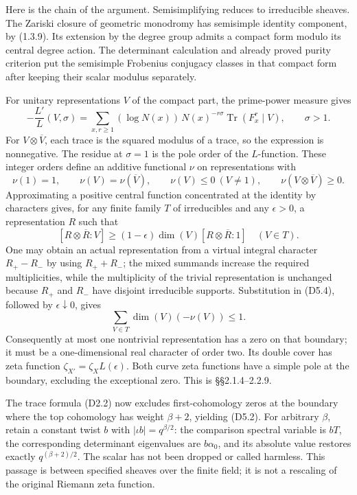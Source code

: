 Here is the chain of the argument. Semisimplifying reduces to
irreducible sheaves. The Zariski closure of geometric monodromy has
semisimple identity component, by (1.3.9). Its extension by the degree
group admits a compact form modulo its central degree action. The
determinant calculation and already proved purity criterion put the
semisimple Frobenius conjugacy classes in that compact form after
keeping their scalar modulus separately.

For unitary representations \(V\) of the compact part, the prime-power
measure gives \[
-\frac{L'}{L}(V,\sigma)
=\sum_{x,r\ge1}(\log N(x))\,N(x)^{-r\sigma}
\operatorname{Tr}(F_x^r\mid V),\qquad \sigma>1.
\tag{D5.3}
\] For \(V\otimes\overline V\), each trace is the squared modulus of a
trace, so the expression is nonnegative. The residue at \(\sigma=1\) is
the pole order of the \(L\)-function. These integer orders define an
additive functional \(\nu\) on representations with \[
\nu(1)=1,\qquad \nu(V)=\nu(\overline V),\qquad
\nu(V)\le0\ (V\ne1),\qquad \nu(V\otimes\overline V)\ge0.
\tag{D5.4}
\] Approximating a positive central function concentrated at the
identity by characters gives, for any finite family \(T\) of
irreducibles and any \(\epsilon>0\), a representation \(R\) such that \[
[R\otimes\overline R:V]\ge
(1-\epsilon)\dim(V)[R\otimes\overline R:1]\quad(V\in T).
\] One may obtain an actual representation from a virtual integral
character \(R_+-R_-\) by using \(R_++R_-\); the mixed summands increase
the required multiplicities, while the multiplicity of the trivial
representation is unchanged because \(R_+\) and \(R_-\) have disjoint
irreducible supports. Substitution in (D5.4), followed by
\(\epsilon\downarrow0\), gives \[
\sum_{V\in T}\dim(V)(-\nu(V))\le1.
\tag{D5.5}
\] Consequently at most one nontrivial representation has a zero on that
boundary; it must be a one-dimensional real character of order two. Its
double cover has zeta function \(\zeta_{X'}=\zeta_X L(\epsilon)\). Both
curve zeta functions have a simple pole at the boundary, excluding the
exceptional zero. This is §§2.1.4--2.2.9.

The trace formula (D2.2) now excludes first-cohomology zeros at the
boundary where the top cohomology has weight \(\beta+2\), yielding
(D5.2). For arbitrary \(\beta\), retain a constant twist \(b\) with
\(|\iota b|=q^{\beta/2}\): the comparison spectral variable is \(bT\),
the corresponding determinant eigenvalues are \(b\alpha_0\), and its
absolute value restores exactly \(q^{(\beta+2)/2}\). The scalar has not
been dropped or called harmless. This passage is between specified
sheaves over the finite field; it is not a rescaling of the original
Riemann zeta function.


